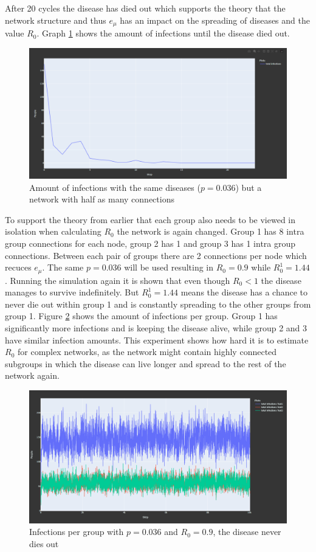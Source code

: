 After 20 cycles the disease has died out which supports the theory that the network structure
and thus $e_\mu$ has an impact on the spreading of diseases and the value $R_0$.
Graph \ref{fig:exp_change_network} shows the amount of infections until the disease died out.

\begin{figure}
    \centering
    \includegraphics[width=0.5\linewidth]{images/exp_changed_network.png}
    \caption{Amount of infections with the same diseases ($p = 0.036$) but a network with half as many connections}
    \label{fig:exp_change_network}
\end{figure}

To support the theory from earlier that each group also needs to be viewed in isolation
when calculating $R_0$ the network is again changed. Group 1 has 8 intra group connections for each node,
group 2 has 1 and group 3 has 1 intra group connections. Between each pair of groups there are
2 connections per node which recuces $e_\mu$. The same $p = 0.036$ will be used resulting in $R_0 = 0.9$
while $R_0^1 = 1.44$. Running the simulation again it is shown that even though $R_0 < 1$ the
disease manages to survive indefinitely. But $R_0^1 = 1.44$ means the disease has a chance to never
die out within group 1 and is constantly spreading to the other groups from group 1. Figure
\ref{fig:exp_subgroups} shows the amount of infections per group. Group 1 has significantly more
infections and is keeping the disease alive, while group 2 and 3 have similar infection amounts.
This experiment shows how hard it is to estimate $R_0$
for complex networks, as the network might contain highly connected subgroups in which
the disease can live longer and spread to the rest of the network again.

\begin{figure}
    \centering
    \includegraphics[width=0.5\linewidth]{images/exp_subgroups.png}
    \caption{Infections per group with $p = 0.036$ and $R_0 = 0.9$, the disease never dies out}
    \label{fig:exp_subgroups}
\end{figure}


